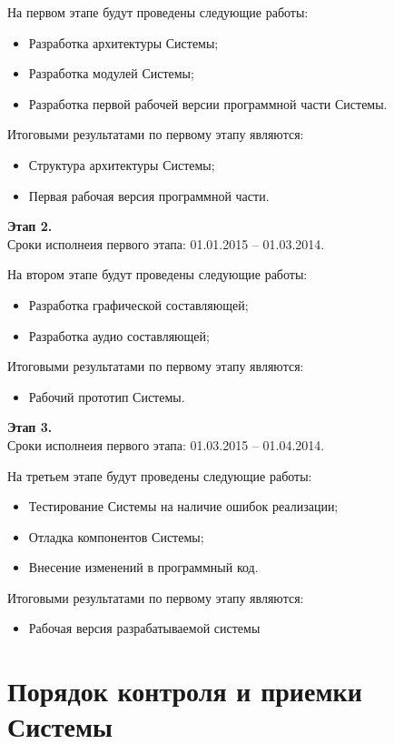 На первом этапе будут проведены следующие работы:
\begin{itemize}
    \item Разработка архитектуры Системы;
    \item Разработка модулей Системы;
    \item Разработка первой рабочей версии программной части Системы.
\end{itemize}
Итоговыми результатами по первому этапу являются:
\begin{itemize}
    \item Структура архитектуры Системы;
    \item Первая рабочая версия программной части.
\end{itemize}

\textbf{Этап 2.}\\
Сроки исполнеия первого этапа: 01.01.2015 -- 01.03.2014.

На втором этапе будут проведены следующие работы:
\begin{itemize}
    \item Разработка графической составляющей;
    \item Разработка аудио составляющей;
\end{itemize}
Итоговыми результатами по первому этапу являются:
\begin{itemize}
    \item Рабочий прототип Системы.
\end{itemize}

\textbf{Этап 3.}\\
Сроки исполнеия первого этапа: 01.03.2015 -- 01.04.2014.

На третьем этапе будут проведены следующие работы:
\begin{itemize}
    \item Тестирование Системы на наличие ошибок реализации;
    \item Отладка компонентов Системы;
    \item Внесение изменений в программный код.
\end{itemize}
Итоговыми результатами по первому этапу являются:
\begin{itemize}
    \item Рабочая версия разрабатываемой системы
\end{itemize}

\chapter{Порядок контроля и приемки Системы}
